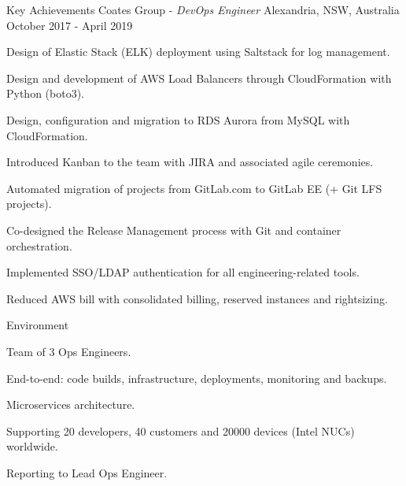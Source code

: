 \begin{cventries}
  \cventry
  {Key Achievements} %
  {Coates Group - \emph{DevOps Engineer}} %
  {Alexandria, NSW, Australia} %
  {October 2017 - April 2019} %
  {
    \begin{cvitems} %
      \item {Design of Elastic Stack (ELK) deployment using Saltstack for log management.}
      \item {Design and development of AWS Load Balancers through CloudFormation with Python (boto3).}
      \item {Design, configuration and migration to RDS Aurora from MySQL with CloudFormation.}
      \item {Introduced Kanban to the team with JIRA and associated agile ceremonies.}
      \item {Automated migration of projects from GitLab.com to GitLab EE (+ Git LFS projects).}
      \item {Co-designed the Release Management process with Git and container orchestration.}
      \item {Implemented SSO/LDAP authentication for all engineering-related tools.}
      \item {Reduced AWS bill with consolidated billing, reserved instances and rightsizing.}
    \end{cvitems}
  }

  \cventry
  {Environment} %
  {} %
  {} %
  {} %
  {
    \begin{cvitems} %
      \item {Team of 3 Ops Engineers.}
      \item {End-to-end: code builds, infrastructure, deployments, monitoring and backups.}
      \item {Microservices architecture.}
      \item {Supporting 20 developers, 40 customers and 20000 devices (Intel NUCs) worldwide.}
      \item {Reporting to Lead Ops Engineer.}
    \end{cvitems}
  }


\end{cventries}
